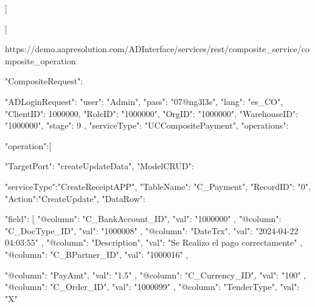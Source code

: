 {{{{{{                ]
                }


                }

                
                
                }

            ]
        }



    }


}



https://demo.aapresolution.com/ADInterface/services/rest/composite_service/composite_operation


{

       "CompositeRequest":{
            "ADLoginRequest": {
            "user": "Admin",
            "pass": "07@ng3l3s",
            "lang": "es_CO",
            "ClientID": 1000000,
            "RoleID": "1000000",
            "OrgID": "1000000",
            "WarehouseID": "1000000",
            "stage": 9
        },
          "serviceType": "UCCompositePayment",
              "operations":{
                  "operation":[
                      {
                      "TargetPort": "createUpdateData",
                      "ModelCRUD": {
                          "serviceType":"CreateReceiptAPP",
                          "TableName": "C_Payment",
                          "RecordID": "0",
                          "Action":"CreateUpdate",
                          "DataRow": {
                      "field": [
                    {
                        "@column": "C_BankAccount_ID",
                        "val": "1000000"
                    }, 
                    {
                        "@column": "C_DocType_ID",
                        "val": "1000008"
                    }, 
                    {
                        "@column": "DateTrx",
                        "val": "2024-04-22 04:03:55"
                    },
                      {
                        "@column": "Description",
                        "val": "Se Realizo el pago correctamente"
                    }, 
                       {
                        "@column": "C_BPartner_ID",
                        "val": "1000016"
                    }, 

                     {
                        "@column": "PayAmt",
                        "val": "1.5"
                    }, 
                         {
                        "@column": "C_Currency_ID",
                        "val": "100"
                    }, 
                     {
                        "@column": "C_Order_ID",
                        "val": "1000099"
                    },
                       {
                        "@column": "TenderType",
                        "val": "X"
                    }      
                    
}}}}}}
